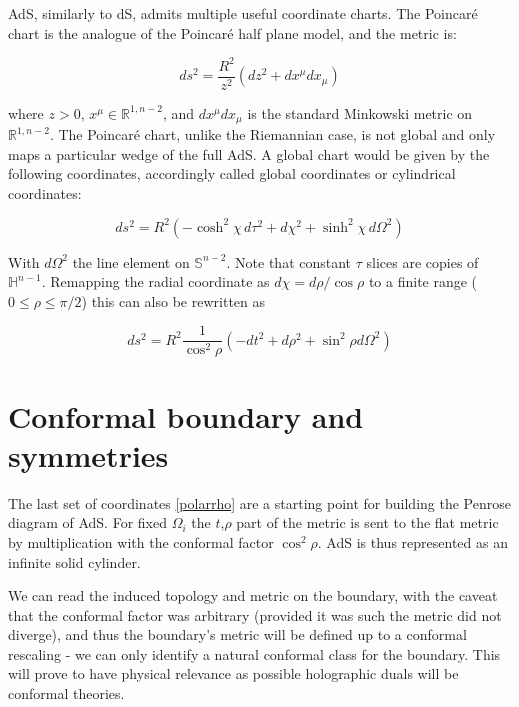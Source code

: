 AdS, similarly to dS, admits multiple useful coordinate charts. The Poincaré chart is the analogue of the Poincaré half plane model, and the metric is:

\begin{equation} \label{poincarechart}
ds^2 = \frac{R^2}{z^2} \left(dz^2 + dx^\mu dx_\mu \right)
\end{equation}

where $z>0$, $x^\mu \in \mathbb{R}^{1,n-2}$, and $dx^\mu dx_\mu$ is the standard Minkowski metric on $\mathbb{R}^{1,n-2}$. The Poincaré chart, unlike the Riemannian case, is not global and only maps a particular wedge of the full AdS. A global chart would be given by the following coordinates, accordingly called global coordinates or cylindrical coordinates:

\begin{equation}
ds^2 = R^2 \left( -\cosh^2 \chi \, d\tau^2 + d\chi^2 + \sinh^2 \chi \, d\Omega^2 \right)
\end{equation}

With $d\Omega^2$ the line element on $\mathbb{S}^{n-2}$. Note that constant $\tau$ slices are copies of $\mathbb{H}^{n-1}$. Remapping the radial coordinate as $d\chi = d\rho/\cos\rho$ to a finite range ($0\le \rho \le \pi/2$) this can also be rewritten as

\begin{equation} \label{polarrho}
	ds^2 = R^2 \frac{1}{\cos^{2} \rho} \left( - dt^2 + d\rho^2 + \sin^2 \rho d\Omega^2  \right)
\end{equation}

\section{Conformal boundary and symmetries}

The last set of coordinates \ref{polarrho} are a starting point for building the Penrose diagram of AdS. For fixed $\Omega_i$ the $t$,$\rho$ part of the metric is sent to the flat metric by multiplication with the conformal factor $\cos^2 \rho$. AdS is thus represented as an infinite solid cylinder.

We can read the induced topology and metric on the boundary, with the caveat that the conformal factor was arbitrary (provided it was such the metric did not diverge), and thus the boundary's metric will be defined up to a conformal rescaling - we can only identify a natural conformal class for the boundary. This will prove to have physical relevance as possible holographic duals will be conformal theories.

